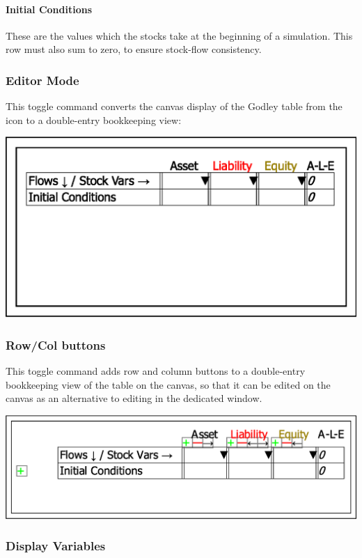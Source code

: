 \paragraph{Initial Conditions}

These are the values which the stocks take at the beginning of a simulation.
This row must also sum to zero, to ensure stock-flow consistency.

\subsubsection{Editor Mode}

This toggle command converts the canvas display of the Godley table
from the icon to a double-entry bookkeeping view:

\noindent\includegraphics[width=\textwidth]{images/GodleyTableEditMode}

\subsubsection{Row/Col buttons}

This toggle command adds row and column buttons to a double-entry
bookkeeping view of the table on the canvas, so that it can be edited
on the canvas as an alternative to editing in the dedicated window.

\noindent\includegraphics[width=\textwidth]{images/GodleyTableEditModeButtons}

\subsubsection{Display Variables}

